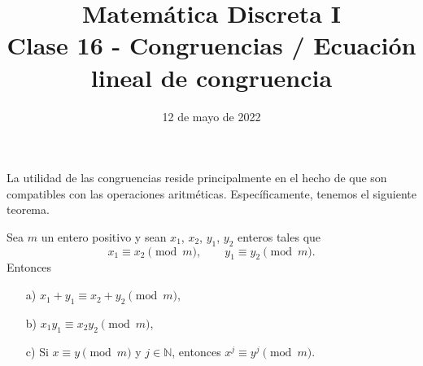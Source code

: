 \documentclass[handout]{beamer} %
\title[Clase 16 - Congruencia ]{Matemática Discreta I \\ Clase 16 - Congruencias / Ecuación lineal de congruencia}
\institute[]{\normalsize FAMAF / UNC
    \\[\baselineskip] ${}^{}$
    \\[\baselineskip]
}
\date[12/05/2022]{12 de mayo de 2022}
\begin{document}
    
    \frame{\titlepage} 
    
    
    \begin{frame}
        La utilidad de las congruencias reside principalmente en el hecho
        de que son compatibles con las operaciones aritméticas. \pause
        Específicamente, tenemos el siguiente teorema.
        
        \begin{teorema}\label{t4.1} Sea $m$ un entero positivo y sean $x_1$, $x_2$,
            $y_1$, $y_2$ enteros tales que
            $$
            x_1 \equiv x_2 \pmod{m}, \qquad y_1 \equiv y_2 \pmod{m}.
            $$
            Entonces
            \begin{enumerate}
                \item[a)] $ x_1+ y_1 \equiv x_2+ y_2 \pmod{m}$,
                \item[b)] $x_1 y_1 \equiv x_2 y_2 \pmod{m}$,
                \item[c)] Si $x \equiv y \pmod{m}$  y $j \in  \mathbb N$, entonces $x^j \equiv y^j \pmod{m}$.
            \end{enumerate}
        \end{teorema}
        
    \end{frame}
    
    
    
\end{document}
